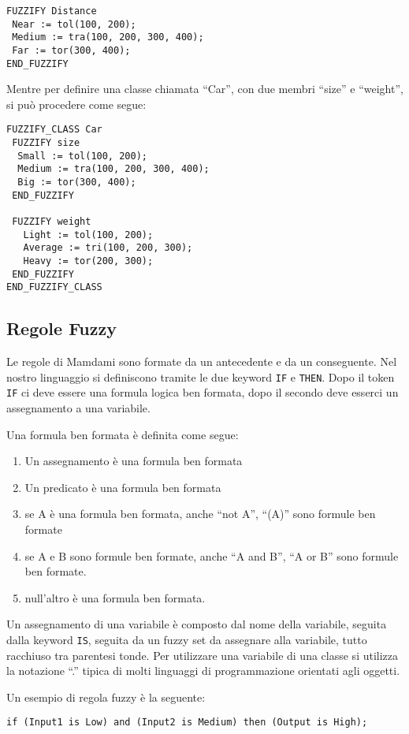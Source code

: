 \begin{verbatim}
FUZZIFY Distance
 Near := tol(100, 200);
 Medium := tra(100, 200, 300, 400);
 Far := tor(300, 400);
END_FUZZIFY
\end{verbatim}

Mentre per definire una classe chiamata ``Car'', con due membri ``size'' e ``weight'', si può procedere come segue:

\begin{verbatim}
FUZZIFY_CLASS Car
 FUZZIFY size
  Small := tol(100, 200);
  Medium := tra(100, 200, 300, 400);
  Big := tor(300, 400);
 END_FUZZIFY
 
 FUZZIFY weight
   Light := tol(100, 200);
   Average := tri(100, 200, 300);
   Heavy := tor(200, 300);
 END_FUZZIFY
END_FUZZIFY_CLASS
\end{verbatim}


\subsection{Regole Fuzzy}
Le regole di Mamdami sono formate da un antecedente e da un conseguente. Nel nostro linguaggio si definiscono tramite le due keyword \verb|IF| e \verb|THEN|.
Dopo il token \verb|IF| ci deve essere una formula logica ben formata, dopo il secondo deve esserci un assegnamento a una variabile.

Una formula ben formata è definita come segue:
\begin{enumerate}
 \item Un assegnamento è una formula ben formata
 \item Un predicato è una formula ben formata
 \item se A è una formula ben formata, anche ``not A'', ``(A)'' sono formule ben formate
 \item se A e B sono formule ben formate, anche ``A and B'', ``A or B'' sono formule ben formate.
 \item null'altro è una formula ben formata.
\end{enumerate}

Un assegnamento di una variabile è composto dal nome della variabile, seguita dalla keyword \verb|IS|, seguita da un fuzzy set da assegnare alla variabile, tutto racchiuso tra parentesi tonde. Per utilizzare una variabile di una classe si utilizza la notazione ``.'' tipica di molti linguaggi di programmazione orientati agli oggetti.

Un esempio di regola fuzzy è la seguente:

\begin{verbatim}
if (Input1 is Low) and (Input2 is Medium) then (Output is High); 
\end{verbatim}



